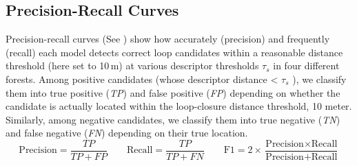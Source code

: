 \subsection*{Precision-Recall Curves}
Precision-recall curves (See ) show how accurately (precision) and frequently (recall) each  model detects correct loop candidates within a reasonable distance threshold (here set to 10\,m) at various descriptor thresholds $\tau_{s}$ in four different forests. Among positive candidates   (whose descriptor distance < $\tau_{s}$ ), we classify them into true positive (\emph{TP}) and false positive (\emph{FP}) depending on whether the candidate is actually located within the loop-closure distance threshold, 10 meter. 
Similarly, among negative candidates, we classify them into true negative (\emph{TN}) and false negative (\emph{FN}) depending on their true location. 
\[ \text{Precision} = \frac{TP}{TP + FP} \quad \quad \text{Recall} = \frac{TP}{TP + FN} \quad \quad \text{F1} = 2 \times \frac{\text{Precision} \times \text{Recall}}{\text{Precision} + \text{Recall}} \]

